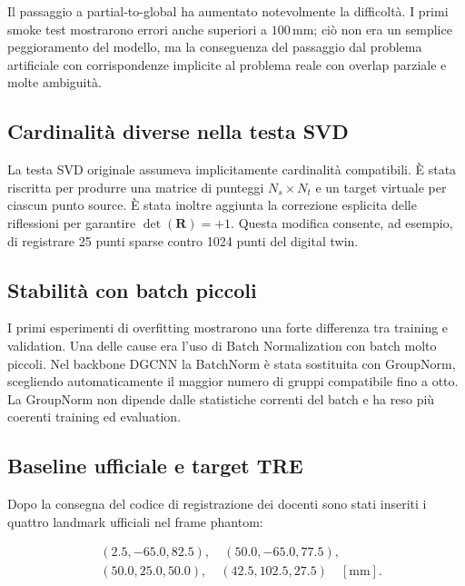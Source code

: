 \documentclass[11pt,a4paper]{article}
\newcommand{\R}{\mathbf{R}}
\newcommand{\SI}[2]{\ensuremath{#1\,#2}}
\newcommand{\si}[1]{\ensuremath{#1}}
\newcommand{\milli}{\mathrm{m}}
\newcommand{\metre}{\mathrm{m}}
\begin{document}
Il passaggio a partial-to-global ha aumentato notevolmente la difficoltà. I
primi smoke test mostrarono errori anche superiori a
\SI{100}{\milli\metre}; ciò non era un semplice peggioramento del modello, ma
la conseguenza del passaggio dal problema artificiale con corrispondenze
implicite al problema reale con overlap parziale e molte ambiguità.

\subsection{Cardinalità diverse nella testa SVD}

La testa SVD originale assumeva implicitamente cardinalità compatibili. È
stata riscritta per produrre una matrice di punteggi
$N_s\times N_t$ e un target virtuale per ciascun punto source. È stata inoltre
aggiunta la correzione esplicita delle riflessioni per garantire
$\det(\R)=+1$. Questa modifica consente, ad esempio, di registrare 25 punti
sparse contro 1024 punti del digital twin.

\subsection{Stabilità con batch piccoli}

I primi esperimenti di overfitting mostrarono una forte differenza tra
training e validation. Una delle cause era l'uso di Batch Normalization con
batch molto piccoli. Nel backbone DGCNN la BatchNorm è stata sostituita con
GroupNorm, scegliendo automaticamente il maggior numero di gruppi compatibile
fino a otto. La GroupNorm non dipende dalle statistiche correnti del batch e
ha reso più coerenti training ed evaluation.

\subsection{Baseline ufficiale e target TRE}

Dopo la consegna del codice di registrazione dei docenti sono stati inseriti i
quattro landmark ufficiali nel frame phantom:

\begin{equation}
\begin{split}
    &(2.5,-65.0,82.5),\quad (50.0,-65.0,77.5),\\
    &(50.0,25.0,50.0),\quad (42.5,102.5,27.5)\quad [\si{\milli\metre}].
\end{split}
\end{equation}
\end{document}
